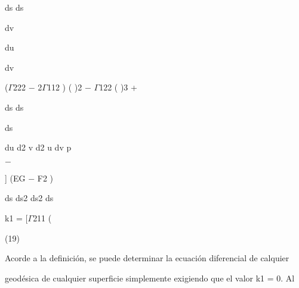 \documentclass[a4paper,portrait,12pt]{article}
\begin{document}
\begin{flushleft}
ds ds
\end{flushleft}


\begin{flushleft}
dv
\end{flushleft}


\begin{flushleft}
du
\end{flushleft}


\begin{flushleft}
dv
\end{flushleft}


\begin{flushleft}
($\Gamma$222 $-$ 2$\Gamma$112 ) ( )2 $-$ $\Gamma$122 ( )3 +
\end{flushleft}


\begin{flushleft}
ds ds
\end{flushleft}


\begin{flushleft}
ds
\end{flushleft}


\begin{flushleft}
du d2 v d2 u dv p
\end{flushleft}


$-$


\begin{flushleft}
] (EG $-$ F2 )
\end{flushleft}


\begin{flushleft}
ds ds2 ds2 ds
\end{flushleft}





\begin{flushleft}
k1 = [$\Gamma$211 (
\end{flushleft}





(19)





\begin{flushleft}
Acorde a la definición, se puede determinar la ecuación diferencial de calquier
\end{flushleft}


\begin{flushleft}
geodésica de cualquier superficie simplemente exigiendo que el valor k1 = 0. Al
\end{flushleft}
\end{document}
